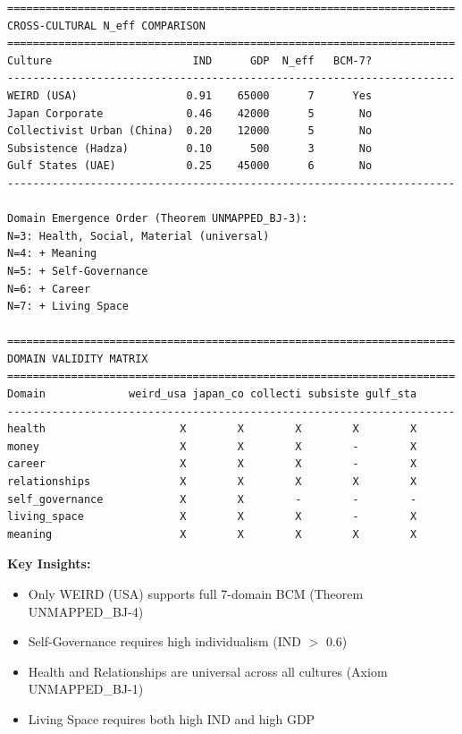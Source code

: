 \begin{verbatim}
======================================================================
CROSS-CULTURAL N_eff COMPARISON
======================================================================
Culture                      IND      GDP  N_eff   BCM-7?
----------------------------------------------------------------------
WEIRD (USA)                 0.91    65000      7      Yes
Japan Corporate             0.46    42000      5       No
Collectivist Urban (China)  0.20    12000      5       No
Subsistence (Hadza)         0.10      500      3       No
Gulf States (UAE)           0.25    45000      6       No
----------------------------------------------------------------------

Domain Emergence Order (Theorem UNMAPPED_BJ-3):
N=3: Health, Social, Material (universal)
N=4: + Meaning
N=5: + Self-Governance
N=6: + Career
N=7: + Living Space

======================================================================
DOMAIN VALIDITY MATRIX
======================================================================
Domain             weird_usa japan_co collecti subsiste gulf_sta
----------------------------------------------------------------------
health                     X        X        X        X        X
money                      X        X        X        -        X
career                     X        X        X        -        X
relationships              X        X        X        X        X
self_governance            X        X        -        -        -
living_space               X        X        X        -        X
meaning                    X        X        X        X        X
\end{verbatim}

\textbf{Key Insights:}
\begin{itemize}[nosep]
\item Only WEIRD (USA) supports full 7-domain BCM (Theorem UNMAPPED_BJ-4)
\item Self-Governance requires high individualism (IND $>$ 0.6)
\item Health and Relationships are universal across all cultures (Axiom UNMAPPED_BJ-1)
\item Living Space requires both high IND and high GDP
\end{itemize}



